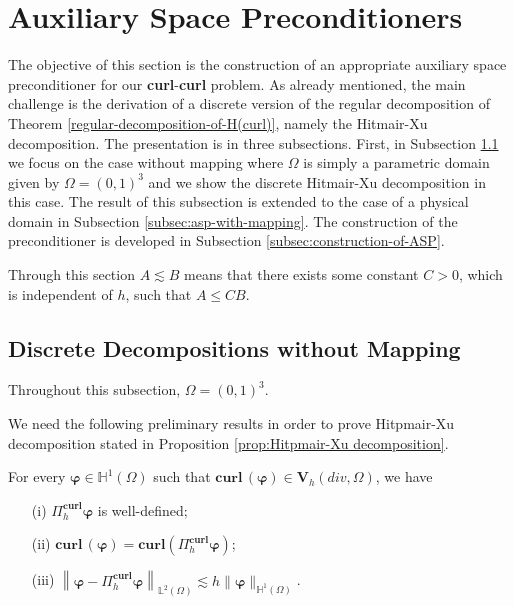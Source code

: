 \section{Auxiliary Space Preconditioners}\label{sec:asp}
The objective of this section is the construction of an appropriate auxiliary space preconditioner for our \textbf{curl}-\textbf{curl} problem. As already mentioned, the main challenge is the derivation of a discrete version of the regular decomposition of Theorem \ref{regular-decomposition-of-H(curl)}, namely the Hitmair-Xu decomposition. The presentation is in three subsections. First, in Subsection \ref{subsec:asp} we focus on the case without mapping where $\Omega$ is simply a parametric domain given by $\Omega=(0,1)^3$ and we show the discrete Hitmair-Xu decomposition in this case. The result of this subsection is extended to the case of a physical domain in Subsection \ref{subsec:asp-with-mapping}. The construction of the preconditioner is developed in Subsection \ref{subsec:construction-of-ASP}.



Through this section $A \lesssim B$ means that there exists some constant $C>0$, which is independent of $h$, such that $A \leq CB$.
 
\subsection{Discrete Decompositions without Mapping}\label{subsec:asp}
Throughout this subsection, $\Omega=(0,1)^3$.

We need the following preliminary results in order to prove Hitpmair-Xu decomposition stated in Proposition \ref{prop:Hitpmair-Xu decomposition}.

\begin{lemma}\label{prelimibary-lemma-1}
For every $\bm{\varphi} \in \mathbb{H}^1(\Omega)$ such that $\textbf{curl} \, (\bm{\varphi}) \in \bm{V}_h(div,\Omega)$, we have
\begin{itemize}
\item[(i)] $\Pi_h^{\textbf{curl}} \bm{\varphi}$ is well-defined;

\item[(ii)] $\textbf{curl}\,(\bm{\varphi})=\textbf{curl}\left( \Pi_h^{\textbf{curl}} \bm{\varphi}\right)$;

\item[(iii)] $\left\| \bm{\varphi}-\Pi_h^{\textbf{curl}} \bm{\varphi} \right\|_{\mathbb{L}^2(\Omega)} \lesssim h \|\bm{\varphi}\|_{\mathbb{H}^1(\Omega)}$.
\end{itemize}
\end{lemma}

